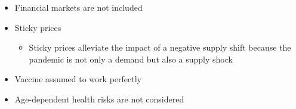 \documentclass[a4paper]{article}
\begin{document}
\begin{itemize}
\begin{itemize}
        \item Financial markets are not included
        \item Sticky prices
        \begin{itemize}
            \item Sticky prices alleviate the impact of a negative supply shift because the pandemic is not only a demand but also a supply shock
        \end{itemize}
        \item Vaccine assumed to work perfectly
        \item Age-dependent health risks are not considered
    \end{itemize}
\end{itemize}
\end{document}
